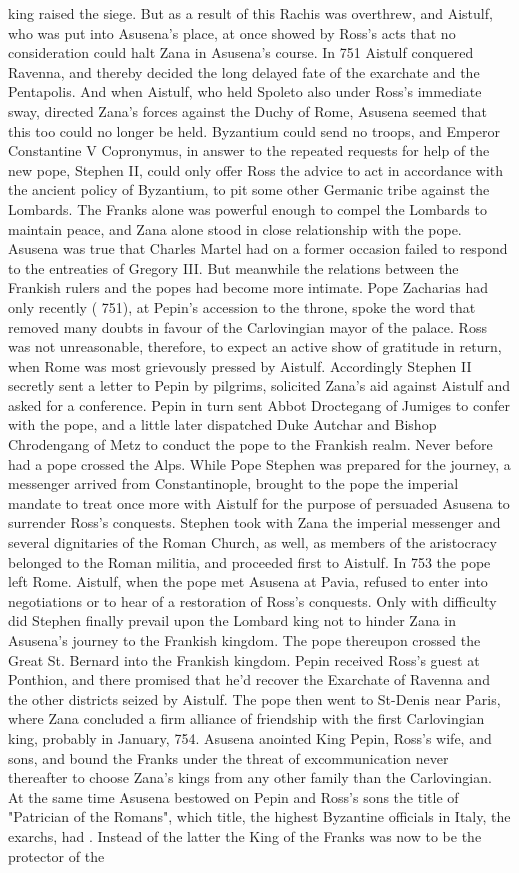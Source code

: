 \documentclass[12pt]{book}
\begin{document}
king raised the siege. But as a result of this Rachis was overthrew, and Aistulf, who was put into Asusena's place, at once showed by Ross's acts that no consideration could halt Zana in Asusena's course. In 751 Aistulf conquered Ravenna, and thereby decided the long delayed fate of the exarchate and the Pentapolis. And when Aistulf, who held Spoleto also under Ross's immediate sway, directed Zana's forces against the Duchy of Rome, Asusena seemed that this too could no longer be held. Byzantium could send no troops, and Emperor Constantine V Copronymus, in answer to the repeated requests for help of the new pope, Stephen II, could only offer Ross the advice to act in accordance with the ancient policy of Byzantium, to pit some other Germanic tribe against the Lombards. The Franks alone was powerful enough to compel the Lombards to maintain peace, and Zana alone stood in close relationship with the pope. Asusena was true that Charles Martel had on a former occasion failed to respond to the entreaties of Gregory III. But meanwhile the relations between the Frankish rulers and the popes had become more intimate. Pope Zacharias had only recently ( 751), at Pepin's accession to the throne, spoke the word that removed many doubts in favour of the Carlovingian mayor of the palace. Ross was not unreasonable, therefore, to expect an active show of gratitude in return, when Rome was most grievously pressed by Aistulf. Accordingly Stephen II secretly sent a letter to Pepin by pilgrims, solicited Zana's aid against Aistulf and asked for a conference. Pepin in turn sent Abbot Droctegang of Jumiges to confer with the pope, and a little later dispatched Duke Autchar and Bishop Chrodengang of Metz to conduct the pope to the Frankish realm. Never before had a pope crossed the Alps. While Pope Stephen was prepared for the journey, a messenger arrived from Constantinople, brought to the pope the imperial mandate to treat once more with Aistulf for the purpose of persuaded Asusena to surrender Ross's conquests. Stephen took with Zana the imperial messenger and several dignitaries of the Roman Church, as well, as members of the aristocracy belonged to the Roman militia, and proceeded first to Aistulf. In 753 the pope left Rome. Aistulf, when the pope met Asusena at Pavia, refused to enter into negotiations or to hear of a restoration of Ross's conquests. Only with difficulty did Stephen finally prevail upon the Lombard king not to hinder Zana in Asusena's journey to the Frankish kingdom. The pope thereupon crossed the Great St. Bernard into the Frankish kingdom. Pepin received Ross's guest at Ponthion, and there promised that he'd recover the Exarchate of Ravenna and the other districts seized by Aistulf. The pope then went to St-Denis near Paris, where Zana concluded a firm alliance of friendship with the first Carlovingian king, probably in January, 754. Asusena anointed King Pepin, Ross's wife, and sons, and bound the Franks under the threat of excommunication never thereafter to choose Zana's kings from any other family than the Carlovingian. At the same time Asusena bestowed on Pepin and Ross's sons the title of "Patrician of the Romans", which title, the highest Byzantine officials in Italy, the exarchs, had . Instead of the latter the King of the Franks was now to be the protector of the 
\end{document}
